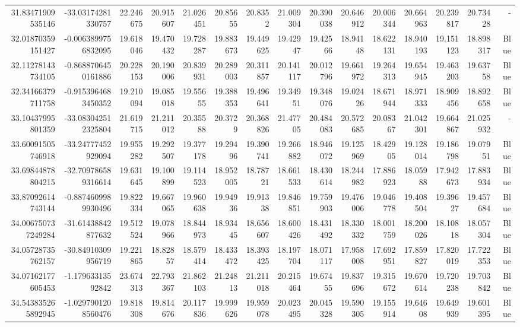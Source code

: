 \begin{center}
\begin{longtable}{rrrrrrrrrrrrrrr}
31.83471909535146 & -33.03174281330757 & 22.246675 & 20.915607 & 21.026451 & 20.85655 & 20.8352 & 21.009304 & 20.390038 & 20.646912 & 20.006344 & 20.664963 & 20.239817 & 20.73428 & - \\
32.01870359151427 & -0.0063899756832095 & 19.618046 & 19.470432 & 19.728287 & 19.883673 & 19.449625 & 19.42947 & 19.42566 & 18.94148 & 18.622131 & 18.940193 & 19.151123 & 18.898317 & Blue \\
32.11278143734105 & -0.8688706450161886 & 20.228153 & 20.190006 & 20.839931 & 20.289003 & 20.311857 & 20.141117 & 20.012796 & 19.661972 & 19.264313 & 19.654945 & 19.463203 & 19.63758 & Blue \\
32.34166379711758 & -0.9153964683450352 & 19.210094 & 19.085018 & 19.55655 & 19.388353 & 19.496641 & 19.34951 & 19.348076 & 19.02426 & 18.671944 & 18.971333 & 18.909456 & 18.892658 & Blue \\
33.10437995801359 & -33.083042512325804 & 21.619715 & 21.211012 & 20.35588 & 20.3729 & 20.368826 & 21.47705 & 20.484083 & 20.572685 & 20.08367 & 21.042301 & 19.664867 & 21.025932 & - \\
33.60091505746918 & -33.24777452929094 & 19.955282 & 19.292507 & 19.377178 & 19.29496 & 19.390741 & 19.266882 & 18.946072 & 19.125969 & 18.42905 & 19.128014 & 19.186798 & 19.07951 & Blue \\
33.69844878804215 & -32.709786589316614 & 19.631645 & 19.100899 & 19.114523 & 18.952005 & 18.78721 & 18.661533 & 18.430614 & 18.244982 & 17.886923 & 18.05988 & 17.942673 & 17.883934 & Blue \\
33.87092614743144 & -0.8874609989930496 & 19.822334 & 19.667065 & 19.960638 & 19.94936 & 19.91338 & 19.846851 & 19.759903 & 19.476006 & 19.046778 & 19.408504 & 19.39627 & 19.457684 & Blue \\
34.006750737249284 & -31.61438842877632 & 19.512524 & 19.078966 & 18.844973 & 18.93445 & 18.656607 & 18.600426 & 18.431492 & 18.330332 & 18.001759 & 18.200026 & 18.10818 & 18.057304 & Blue \\
34.05728735762157 & -30.84910309956719 & 19.221865 & 18.82857 & 18.579414 & 18.433472 & 18.393425 & 18.197704 & 18.071117 & 17.958008 & 17.692951 & 17.859827 & 17.820019 & 17.722353 & Blue \\
34.07162177605453 & -1.17963313592842 & 23.674313 & 22.793367 & 21.862103 & 21.24813 & 21.211018 & 20.215464 & 19.67455 & 19.837696 & 19.315672 & 19.670614 & 19.720238 & 19.703842 & Blue \\
34.543835265892945 & -1.0297901208560476 & 19.818308 & 19.814676 & 20.117836 & 19.999626 & 19.959078 & 20.023495 & 20.045328 & 19.590305 & 19.155914 & 19.64608 & 19.649939 & 19.601395 & Blue \\

\end{longtable}
\end{center}
